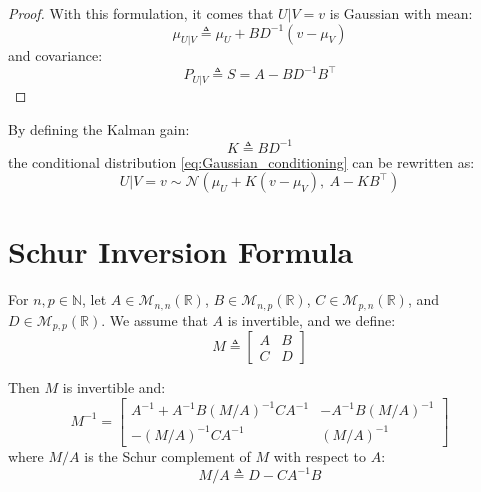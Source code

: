 \begin{proof}
	With this formulation, it comes that $U|V=v$ is Gaussian with mean:
	\begin{equation}
		\mu_{U|V}\triangleq\mu_U+BD^{-1}\left(v-\mu_V\right)
	\end{equation}
	and covariance:
	\begin{equation}
		P_{U|V}\triangleq S=A-BD^{-1}B^\top
	\end{equation}
\end{proof}

\begin{remark}
	By defining the Kalman gain:
	\begin{equation}
		K\triangleq BD^{-1}
	\end{equation}
	the conditional distribution \eqref{eq:Gaussian_conditioning} can be rewritten as:
	\begin{equation}
		U|V=v\sim\mathcal{N}\left(\mu_U+K(v-\mu_V),\:A-KB^\top\right)
	\end{equation}
\end{remark}

\section{Schur Inversion Formula}

\begin{proposition}\label{th:Schur}
	For $n,p\in\mathbb{N}$, let $A\in\mathcal{M}_{n,n}(\mathbb{R})$, $B\in\mathcal{M}_{n,p}(\mathbb{R})$, $C\in\mathcal{M}_{p,n}(\mathbb{R})$, and $D\in\mathcal{M}_{p,p}(\mathbb{R})$. We assume that $A$ is invertible, and we define:
	\begin{equation}
		M\triangleq\begin{bmatrix}A&B\\C&D\end{bmatrix}
	\end{equation}

	Then $M$ is invertible and:
	\begin{equation}
		M^{-1}=\begin{bmatrix}A^{-1}+A^{-1}B(M/A)^{-1}CA^{-1}&-A^{-1}B(M/A)^{-1}\\-(M/A)^{-1}CA^{-1}&(M/A)^{-1}\end{bmatrix}
	\end{equation}
	where $M/A$ is the Schur complement of $M$ with respect to $A$:
	\begin{equation}
		M/A\triangleq D-CA^{-1}B
	\end{equation}
\end{proposition}

